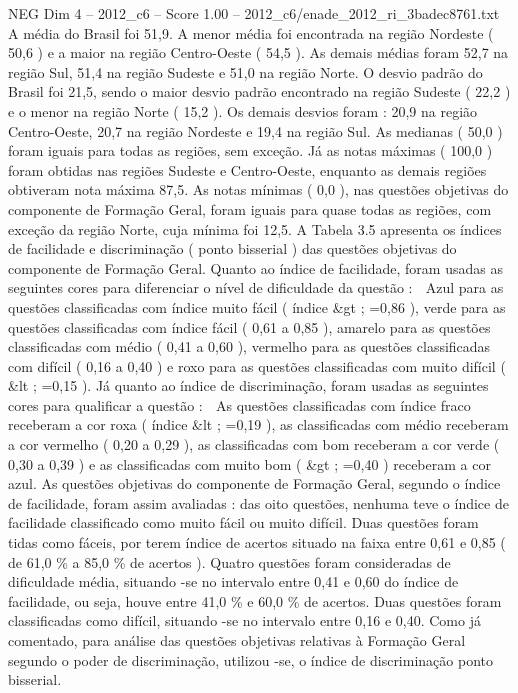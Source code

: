 \begin{textsample}{NEG Dim 4 – 2012\_c6 – Score 1.00 – 2012\_c6/enade\_2012\_ri\_3badec8761.txt}
A média do Brasil foi 51,9.
A menor média foi encontrada na região Nordeste ( 50,6 ) e a maior na região Centro-Oeste ( 54,5 ).
As demais médias foram 52,7 na região Sul, 51,4 na região Sudeste e 51,0 na região Norte.
O desvio padrão do Brasil foi 21,5, sendo o maior desvio padrão encontrado na região Sudeste ( 22,2 ) e o menor na região Norte ( 15,2 ).
Os demais desvios foram : 20,9 na região Centro-Oeste, 20,7 na região Nordeste e 19,4 na região Sul.
As medianas ( 50,0 ) foram iguais para todas as regiões, sem exceção.
Já as notas máximas ( 100,0 ) foram obtidas nas regiões Sudeste e Centro-Oeste, enquanto as demais regiões obtiveram nota máxima 87,5.
As notas mínimas ( 0,0 ), nas questões objetivas do componente de Formação Geral, foram iguais para quase todas as regiões, com exceção da região Norte, cuja mínima foi 12,5.
A Tabela 3.5 apresenta os índices de facilidade e discriminação ( ponto bisserial ) das questões objetivas do componente de Formação Geral.
Quanto ao índice de facilidade, foram usadas as seguintes cores para diferenciar o nível de dificuldade da questão :  Azul para as questões classificadas com índice muito fácil ( índice \&gt ; =0,86 ), verde para as questões classificadas com índice fácil ( 0,61 a 0,85 ), amarelo para as questões classificadas com médio ( 0,41 a 0,60 ), vermelho para as questões classificadas com difícil ( 0,16 a 0,40 ) e roxo para as questões classificadas com muito difícil ( \&lt ; =0,15 ).
Já quanto ao índice de discriminação, foram usadas as seguintes cores para qualificar a questão :  As questões classificadas com índice fraco receberam a cor roxa ( índice \&lt ; =0,19 ), as classificadas com médio receberam a cor vermelho ( 0,20 a 0,29 ), as classificadas com bom receberam a cor verde ( 0,30 a 0,39 ) e as classificadas com muito bom ( \&gt ; =0,40 ) receberam a cor azul.
As questões objetivas do componente de Formação Geral, segundo o índice de facilidade, foram assim avaliadas : das oito questões, nenhuma teve o índice de facilidade classificado como muito fácil ou muito difícil.
Duas questões foram tidas como fáceis, por terem índice de acertos situado na faixa entre 0,61 e 0,85 ( de 61,0 \% a 85,0 \% de acertos ).
Quatro questões foram consideradas de dificuldade média, situando -se no intervalo entre 0,41 e 0,60 do índice de facilidade, ou seja, houve entre 41,0 \% e 60,0 \% de acertos.
Duas questões foram classificadas como difícil, situando -se no intervalo entre 0,16 e 0,40.
Como já comentado, para análise das questões objetivas relativas à Formação Geral segundo o poder de discriminação, utilizou -se, o índice de discriminação ponto bisserial.

\end{textsample}
